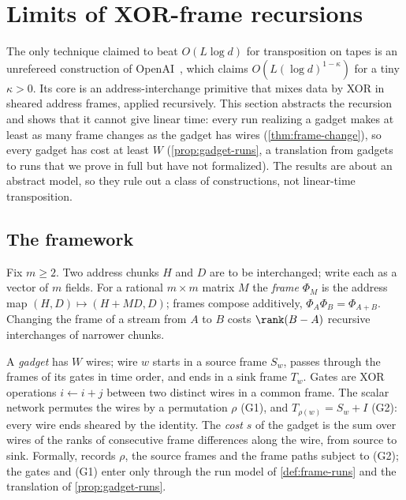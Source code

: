 \section{Limits of XOR-frame recursions}\label{sec:frames}

The only technique claimed to beat $O(L\log d)$ for transposition on tapes is an unrefereed
construction of OpenAI~\cite{OpenAI2026mult}, which claims $O(L(\log d)^{1-\kappa})$ for a tiny
$\kappa>0$. Its core is an address-interchange primitive that mixes data by XOR in sheared address
frames, applied recursively. This section abstracts the recursion and shows that it cannot give linear time: every run realizing a gadget makes at least as many frame changes as the gadget has wires (\cref{thm:frame-change}), so every gadget has cost at least $W$ (\cref{prop:gadget-runs}, a translation from gadgets to runs that we prove in full but have not formalized). The results are about an
abstract model, so they rule out a class of constructions, not linear-time transposition.

\subsection{The framework}

Fix $m\ge2$. Two address chunks $H$ and $D$ are to be interchanged; write each as a vector of $m$
fields. For a rational $m\times m$ matrix $M$ the \emph{frame} $\Phi_M$ is the address map
$(H,D)\mapsto(H+MD,D)$; frames compose additively, $\Phi_A\Phi_B=\Phi_{A+B}$. Changing the frame of a
stream from $A$ to $B$ costs $\rank(B-A)$ recursive interchanges of narrower chunks.

\begin{definition}[Gadget]\label{def:gadget}
A \emph{gadget} has $W$ wires; wire $w$ starts in a source frame $S_w$, passes through the frames of its
gates in time order, and ends in a sink frame $T_w$. Gates are XOR operations $i\leftarrow i+j$ between two distinct wires in a common frame. The scalar network permutes the wires by a permutation $\rho$ (G1), and
$T_{\rho(w)}=S_w+I$ (G2): every wire ends sheared by the identity. The \emph{cost} $s$ of the gadget is
the sum over wires of the ranks of consecutive frame differences along the wire, from source to sink.
Formally,  records $\rho$, the source frames and the frame paths subject to
(G2); the gates and (G1) enter only through the run model of \cref{def:frame-runs} and the translation of \cref{prop:gadget-runs}.
\end{definition}

